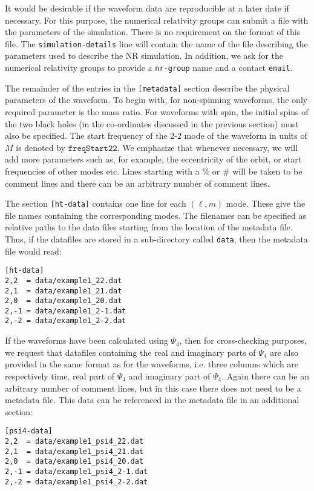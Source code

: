 \documentclass[prd,preprintnumbers,superscriptaddress,eqsecnum]{revtex4}
\numberwithin{equation}{section}
\begin{document}
It would be desirable if the waveform data are reproducible at a later
date if necessary. For this purpose, the numerical relativity groups
can submit a file with the parameters of the simulation. There is no
requirement on the format of this file. The
\texttt{simulation-details} line will contain the name of the file
describing the parameters used to describe the NR simulation. In
addition, we ask for the numerical relativity groups to provide a
\texttt{nr-group} name and a contact \texttt{email}.

The remainder of the entries in the \texttt{[metadata]} section
describe the physical parameters of the waveform. To begin with, for
non-spinning waveforms, the only required parameter is the mass ratio.
For waveforms with spin, the initial spins of the two black holes (in
the co-ordinates discussed in the previous section) must also be
specified.  The start frequency of the 2-2 mode of the waveform in
units of $M$ is denoted by $\mathtt{freqStart22}$. We emphasize that
whenever necessary, we will add more parameters such as, for example,
the eccentricity of the orbit, or start frequencies of other modes
etc.  Lines starting with a $\%$ or $\#$ will be taken to be comment
lines and there can be an arbitrary number of comment lines.

The section \texttt{[ht-data]} contains one line for each $(\ell,m)$
mode. These give the file names containing the corresponding modes.
The filenames can be specified as relative paths to the data files
starting from the location of the metadata file. Thus, if the
datafiles are stored in a sub-directory called \texttt{data}, then the
metadata file would read:
\begin{verbatim}
[ht-data]
2,2  = data/example1_22.dat
2,1  = data/example1_21.dat
2,0  = data/example1_20.dat
2,-1 = data/example1_2-1.dat
2,-2 = data/example1_2-2.dat
\end{verbatim}

If the waveforms have been calculated using $\Psi_4$, then for
cross-checking purposes, we request that datafiles containing the real
and imaginary parts of $\Psi_4$ are also provided in the same format as
for the waveforms, i.e. three columns which are respectively time, real
part of $\Psi_4$ and imaginary part of $\Psi_4$. Again there can be an
arbitrary number of comment lines, but in this case there does not need
to be a metadata file. This data can be referenced in the metadata
file in an additional section:

\begin{verbatim}
[psi4-data]
2,2  = data/example1_psi4_22.dat
2,1  = data/example1_psi4_21.dat
2,0  = data/example1_psi4_20.dat
2,-1 = data/example1_psi4_2-1.dat
2,-2 = data/example1_psi4_2-2.dat
\end{verbatim}
\end{document}
